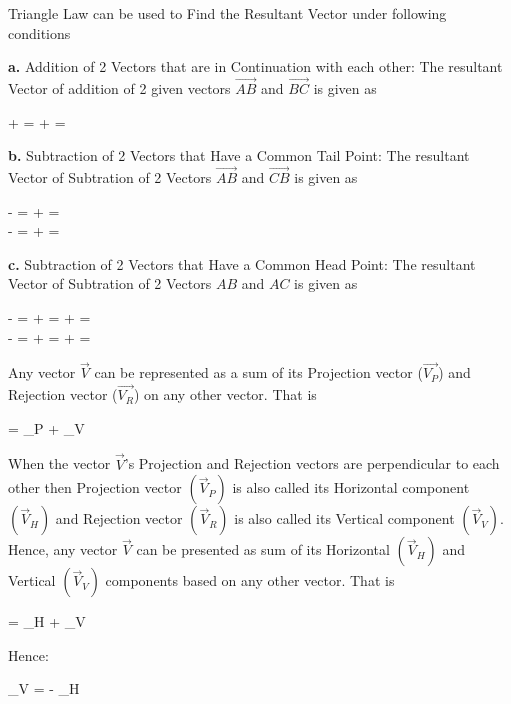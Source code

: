 \documentclass{article}
\begin{document}
Triangle Law can be used to Find the Resultant Vector under following conditions

\textbf{a.} Addition of 2 Vectors that are in Continuation with each other: The resultant Vector of addition of 2 given vectors $\vec{AB}$ and $\vec{BC}$ is given as

\beq
{} +  =  +  = 
\eeq


\textbf{b.} Subtraction of 2 Vectors that Have a Common Tail Point: The resultant Vector of Subtration of 2 Vectors $\vec{AB}$ and $\vec{CB}$ is given as

\beq
{} -  =  +  =  \\
 -  =  +  = 
\eeq


\textbf{c.} Subtraction of 2 Vectors that Have a Common Head Point: The resultant Vector of Subtration of 2 Vectors $AB$ and $AC$ is given as


\beq
{} -  =  +  =  +  =  \\
 -  =  +  =  +  = 
\eeq






Any vector $\vec{V}$ can be represented as a sum of its Projection vector ($\vec{V_{P}}$) and Rejection vector ($\vec{V_{R}}$) on any other vector. That is

\beq
{} = _{P} + _{V}
\eeq

When the vector $\vec{V}$'s Projection and Rejection vectors are perpendicular to each other then Projection vector $(\vec{V}_{P})$ is also called its Horizontal component $(\vec{V}_{H})$ and Rejection vector $(\vec{V}_{R})$ is also called its Vertical component $(\vec{V}_{V})$.
Hence, any vector $\vec{V}$ can be presented as sum of its Horizontal $(\vec{V}_{H})$ and Vertical
$(\vec{V}_{V})$ components based on any other vector. That is

\beq
{} = _{H} + _{V}
\eeq

Hence:

\beq \label{rejection_component}
_{V} =  - _{H}
\eeq

\end{document}
